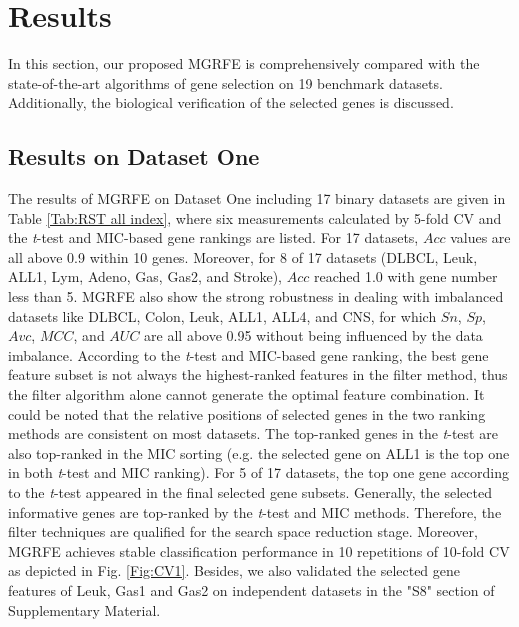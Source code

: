 \documentclass[10pt,journal,compsoc]{IEEEtran}
\begin{document}
	\section{Results}
	
	In this section, our proposed MGRFE is comprehensively compared with the state-of-the-art algorithms of gene selection on 19 benchmark datasets.
	Additionally, the biological verification of the selected genes is discussed.
	
	\subsection{Results on Dataset One}
	 
	The results of MGRFE on Dataset One including 17 binary datasets are given in Table \ref{Tab:RST all index}, where six measurements calculated by 5-fold CV and the \textit{t}-test and MIC-based gene rankings are listed. For 17 datasets, \(Acc\) values are all above 0.9 within 10 genes. Moreover, for 8 of 17 datasets (DLBCL, Leuk, ALL1, Lym, Adeno, Gas, Gas2, and Stroke), \(Acc\) reached 1.0 with gene number less than 5. MGRFE also show the strong robustness in dealing with imbalanced datasets like DLBCL, Colon, Leuk, ALL1, ALL4, and CNS, for which \(Sn\), \(Sp\), \(Avc\), \(MCC\), and \(AUC\) are all above 0.95 without being influenced by the data imbalance. 
	According to the \textit{t}-test and MIC-based gene ranking, the best gene feature subset is not always the highest-ranked features in the filter method, thus the filter algorithm alone cannot generate the optimal feature combination.
	It could be noted that the relative positions of selected genes in the two ranking methods are consistent on most datasets. The top-ranked genes in the \textit{t}-test are also top-ranked in the MIC sorting (e.g. the selected gene on ALL1 is the top one in both \textit{t}-test and MIC ranking). For 5 of 17 datasets, the top one gene  according to the \textit{t}-test appeared in the final selected gene subsets. Generally, the selected informative genes are top-ranked by the \textit{t}-test and MIC methods. Therefore, the filter techniques are qualified for the search space reduction stage. Moreover, MGRFE achieves stable classification performance in 10 repetitions of 10-fold CV as depicted in Fig. \ref{Fig:CV1}. Besides, we also validated the selected gene features of Leuk, Gas1 and Gas2 on independent datasets in the "S8" section of Supplementary Material.
	
\end{document}

